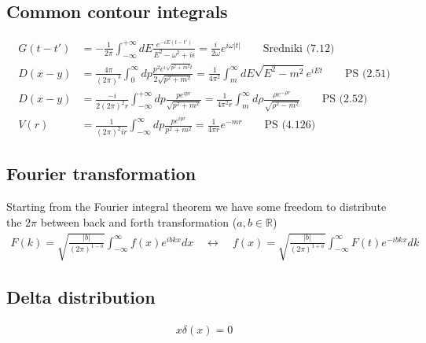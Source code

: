 \documentclass[10pt,a4paper]{book}
\theoremstyle{definition}
\begin{document}
\subsection{Common contour integrals}
\begin{align}
G(t-t')&=-\frac{1}{2\pi}\int_{-\infty}^{+\infty}dE\frac{e^{-iE(t-t')}}{E^2-\omega^2+i\epsilon}=\frac{i}{2\omega}e^{i\omega|t|}\qquad\text{Sredniki (7.12)}\\
D(x-y)&=\frac{4\pi}{(2\pi)^3}\int_{0}^{\infty} dp\frac{p^2 e^{i\sqrt{p^2+m^2}t}}{2\sqrt{p^2+m^2}}=\frac{1}{4\pi^2}\int_m^\infty dE\sqrt{E^2-m^2}e^{iEt}\qquad \text{PS (2.51)}\\
D(x-y)&=\frac{-i}{2(2\pi)^2r}\int_{-\infty}^{+\infty} dp\frac{p e^{ipr}}{\sqrt{p^2+m^2}}=\frac{1}{4\pi^2 r}\int_m^\infty d\rho\frac{\rho e^{-\rho r}}{\sqrt{\rho^2-m^2}}\qquad\text{PS (2.52)}\\
V(r)&=\frac{1}{(2\pi)^2ir}\int_{-\infty}^\infty dp\frac{p e^{ipr}}{p^2+m^2}=\frac{1}{4\pi r}e^{-mr}\qquad\text{PS (4.126)}
\end{align}


\subsection{Fourier transformation}
Starting from the Fourier integral theorem we have some freedom to distribute the $2\pi$ between back and forth transformation ($a,b\in\mathbb{R}$)
\begin{align}
    F(k)=\sqrt{\frac{|b|}{(2\pi)^{1-a}}}\int_{-\infty}^\infty f(x)e^{ibkx}dx\quad\leftrightarrow\quad f(x)=\sqrt{\frac{|b|}{(2\pi)^{1+a}}}\int_{-\infty}^\infty F(t)e^{-ibkx}dk
\end{align}

\subsection{Delta distribution}
\begin{align}
x\delta(x)=0
\end{align}
\end{document}
